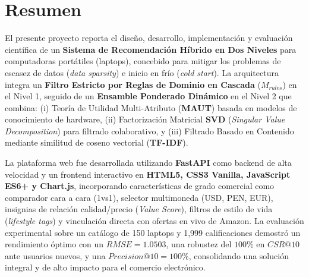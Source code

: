 \documentclass[12pt,a4paper]{article}
\begin{document}
\section*{Resumen}

El presente proyecto reporta el diseño, desarrollo, implementación y evaluación científica de un \textbf{Sistema de Recomendación Híbrido en Dos Niveles} para computadoras portátiles (laptops), concebido para mitigar los problemas de escasez de datos (\textit{data sparsity}) e inicio en frío (\textit{cold start}). La arquitectura integra un \textbf{Filtro Estricto por Reglas de Dominio en Cascada} ($M_{rules}$) en el Nivel 1, seguido de un \textbf{Ensamble Ponderado Dinámico} en el Nivel 2 que combina: (i) Teoría de Utilidad Multi-Atributo (\textbf{MAUT}) basada en modelos de conocimiento de hardware, (ii) Factorización Matricial \textbf{SVD} (\textit{Singular Value Decomposition}) para filtrado colaborativo, y (iii) Filtrado Basado en Contenido mediante similitud de coseno vectorial (\textbf{TF-IDF}). 

La plataforma web fue desarrollada utilizando \textbf{FastAPI} como backend de alta velocidad y un frontend interactivo en \textbf{HTML5, CSS3 Vanilla, JavaScript ES6+ y Chart.js}, incorporando características de grado comercial como comparador cara a cara (1vs1), selector multimoneda (USD, PEN, EUR), insignias de relación calidad/precio (\textit{Value Score}), filtros de estilo de vida (\textit{lifestyle tags}) y vinculación directa con ofertas en vivo de Amazon. La evaluación experimental sobre un catálogo de 150 laptops y 1,999 calificaciones demostró un rendimiento óptimo con un $RMSE = 1.0503$, una robustez del $100\%$ en $CSR@10$ ante usuarios nuevos, y una $Precision@10 = 100\%$, consolidando una solución integral y de alto impacto para el comercio electrónico.

\clearpage

\tableofcontents
{}
\clearpage

\listoftables
{}
\clearpage

\listoffigures
{}
\clearpage

\end{document}
